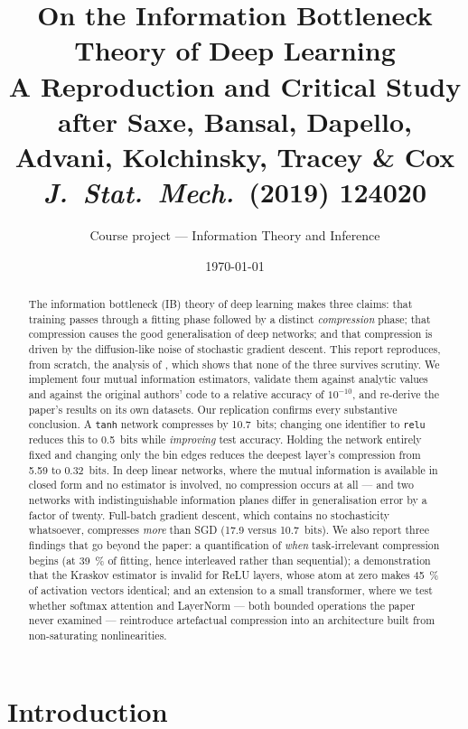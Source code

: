 \documentclass[11pt,a4paper]{article}
\title{\bfseries On the Information Bottleneck Theory of Deep Learning\\
       \large A Reproduction and Critical Study\\[2pt]
       \normalsize after Saxe, Bansal, Dapello, Advani, Kolchinsky, Tracey \& Cox\\
       \normalsize\emph{J.\ Stat.\ Mech.}\ (2019) 124020}
\author{Course project --- Information Theory and Inference}
\date{\today}
\begin{document}
\maketitle

\begin{abstract}
\noindent
The information bottleneck (IB) theory of deep learning makes three claims: that
training passes through a fitting phase followed by a distinct \emph{compression}
phase; that compression causes the good generalisation of deep networks; and that
compression is driven by the diffusion-like noise of stochastic gradient descent.
This report reproduces, from scratch, the analysis of \citet{saxe2019information},
which shows that none of the three survives scrutiny. We implement four mutual
information estimators, validate them against analytic values and against the
original authors' code to a relative accuracy of $10^{-10}$, and re-derive the
paper's results on its own datasets.
Our replication confirms every substantive conclusion. A \texttt{tanh} network
compresses by \SI{10.7}{bits}; changing one identifier to \texttt{relu} reduces
this to \SI{0.5}{bits} while \emph{improving} test accuracy. Holding the network
entirely fixed and changing only the bin edges reduces the deepest layer's
compression from \SI{5.59}{} to \SI{0.32}{bits}. In deep linear networks, where
the mutual information is available in closed form and no estimator is involved,
no compression occurs at all --- and two networks with indistinguishable
information planes differ in generalisation error by a factor of twenty.
Full-batch gradient descent, which contains no stochasticity whatsoever,
compresses \emph{more} than SGD (\SI{17.9}{} versus \SI{10.7}{bits}).
We also report three findings that go beyond the paper: a quantification of
\emph{when} task-irrelevant compression begins (at \SI{39}{\percent} of fitting,
hence interleaved rather than sequential); a demonstration that the Kraskov
estimator is invalid for ReLU layers, whose atom at zero makes
\SI{45}{\percent} of activation vectors identical; and an extension to a small
transformer, where we test whether softmax attention and LayerNorm --- both
bounded operations the paper never examined --- reintroduce artefactual
compression into an architecture built from non-saturating nonlinearities.
\end{abstract}

\tableofcontents
\newpage

\section{Introduction}
\end{document}
